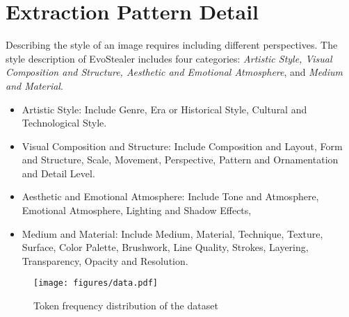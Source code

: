 \section{Extraction Pattern Detail} \label{app_pattern}
Describing the style of an image requires including different perspectives. The style description of EvoStealer includes four categories: \textit{Artistic Style, Visual Composition and Structure, Aesthetic and Emotional Atmosphere}, and \textit{Medium and Material}.
\begin{itemize}
    \item Artistic Style: Include Genre, Era or Historical Style, Cultural and Technological Style.
    \item Visual Composition and Structure: Include Composition and Layout, Form and Structure, Scale, Movement, Perspective, Pattern and Ornamentation and Detail Level.
    \item Aesthetic and Emotional Atmosphere: Include Tone and Atmosphere, Emotional Atmosphere, Lighting and Shadow Effects,
    \item Medium and Material: Include Medium, Material, Technique, Texture, Surface, Color Palette, Brushwork, Line Quality, Strokes, Layering, Transparency, Opacity and Resolution.
\end{itemize}


\begin{figure}[h!]
    \centering
    \texttt{[image: figures/data.pdf]}
    \caption{Token frequency distribution of the dataset}
    \label{fig:data}
\end{figure}




